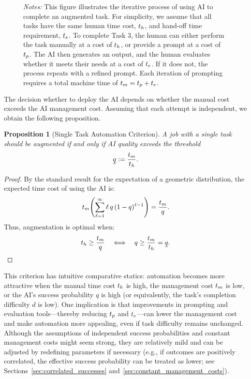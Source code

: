 \documentclass{article}
\theoremstyle{plain}
\theoremstyle{plain}
\newtheorem{proposition}[theorem]{Proposition}
\begin{document}
\begin{figure}[h]
\begin{center}
{\begin{tikzpicture}[node distance=1.8cm]
\end{tikzpicture}}
   \end{center}
  \footnotesize{
  \emph{Notes:} This figure illustrates the iterative process of using AI to complete an augmented task.  
  For simplicity, we assume that all tasks have the same human time cost, $\humantime$, and hand-off time requirement, $\handofftime{}$.  
  To complete Task 3, the human can either perform the task manually at a cost of $\humantime$, or provide a prompt at a cost of $\timecost{p}$. 
  The AI then generates an output, and the human evaluates whether it meets their needs at a cost of $\timecost{e}$.  
  If it does not, the process repeats with a refined prompt.  
  Each iteration of prompting requires a total machine time of $\machinetime = \timecost{p} + \timecost{e}$.}
\end{figure}

The decision whether to deploy the AI depends on whether the manual cost exceeds the AI management cost.
Assuming that each attempt is independent, we obtain the following proposition.

\begin{proposition}[Single Task Automation Criterion] 
\label{proposition:single}
A job with a single task should be augmented if and only if AI quality exceeds the threshold
$$\underline{q} := \frac{\machinetime}{\humantime}.$$
\end{proposition}

\begin{proof}
By the standard result for the expectation of a geometric distribution, the expected time cost of using the AI is:
$$\machinetime \Biggl( \sum_{\ell=1}^{\infty} \ell\,q\,(1 - q)^{\ell - 1} \Biggr) = \frac{\machinetime}{q}.$$
Thus, augmentation is optimal when:
$$\humantime \geq \frac{\machinetime}{q} \quad \Longleftrightarrow \quad q \geq \frac{\machinetime}{\humantime} = \underline{q}.$$
\end{proof}

This criterion has intuitive comparative statics: automation becomes more attractive when the manual time cost $\humantime$ is high, the management cost $\machinetime$ is low, or the AI's success probability $q$ is high (or equivalently, the task's completion difficulty $d$ is low).
One implication is that improvements in prompting and evaluation tools---thereby reducing $\timecost{p}$ and $\timecost{e}$---can lower the management cost and make automation more appealing, even if task difficulty remains unchanged.
Although the assumptions of independent success probabilities and constant management costs might seem strong, they are relatively mild and can be adjusted by redefining parameters if necessary (e.g., if outcomes are positively correlated, the effective success probability can be treated as lower; see Sections~\ref{sec:correlated_successes} and~\ref{sec:constant_management_costs}).
\end{document}
